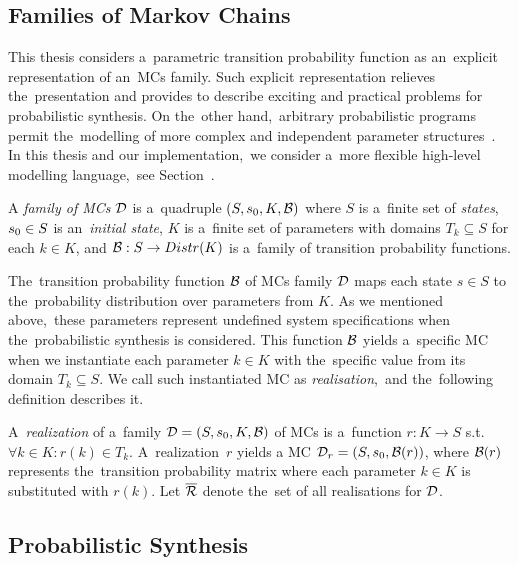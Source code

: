 \subsection{Families of Markov Chains}
This thesis considers a~parametric transition probability function as an~explicit representation of an~MCs family.
Such explicit representation relieves the~presentation and provides to describe exciting and practical problems for probabilistic synthesis.
On the~other hand,~arbitrary probabilistic programs permit the~modelling of more complex and independent parameter structures~\cite{cegar}.
In this thesis and our implementation,~we consider a~more flexible high-level modelling language,~see Section~.

\begin{definition}
\cite{cegar}
    A \emph{family of MCs} $\mathcal{D}$ is a~quadruple $(S,s_{0},K,\mathcal{B})$  where $S$ is a~finite set of \emph{states}, $s_{0} \in S$ is an~\emph{initial state}, $K$ is a~finite set of parameters with domains $T_k  \subseteq S$ for each $k \in K$, and $\mathcal{B} : S \rightarrow Distr(K)$ is a~family of transition probability functions.
\end{definition}

The~transition probability function $\mathcal{B}$ of MCs family $\mathcal{D}$ maps each state $s \in S$ to the~probability distribution over parameters from $K$.
As we mentioned above,~these parameters represent undefined system specifications when the~probabilistic synthesis is considered.
This function $\mathcal{B}$ yields a~specific MC when we instantiate each parameter $k \in K$ with the~specific value from its domain $T_k \subseteq S$.
We call such instantiated MC as \textit{realisation},~and the~following definition describes it.

\begin{definition}[Realisation]
\cite{cegar}
A~\emph{realization} of a~family $\mathcal{D} = (S,s_{0},K,\mathcal{B})$ of MCs is a~function $r: K \rightarrow S$ s.t.~$\forall k \in K :  r(k) \in T_k$. 
A~realization~$r$ yields a MC $\mathcal{D}_r = (S,s_{0},\mathcal{B}(r))$, where $\mathcal{B}(r)$ represents the~transition probability matrix where each parameter $k \in K$ is substituted with $r(k)$. 
Let $\overline{\mathcal{R}}$ denote the~set of all realisations for $\mathcal{D}$.
\end{definition}

\subsection{Probabilistic Synthesis}

